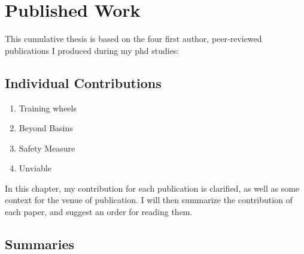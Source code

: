 
\chapter{Published Work} \label{chap:pubs}
This cumulative thesis is based on the four first author, peer-reviewed publications I produced during my phd studies:

\section{Individual Contributions}
\begin{enumerate}
    \item Training wheels
    \item Beyond Basins
    \item Safety Measure
    \item Unviable
\end{enumerate}

In this chapter, my contribution for each publication is clarified, as well as some context for the venue of publication. I will then summarize the contribution of each paper, and suggest an order for reading them.

\section{Summaries}
